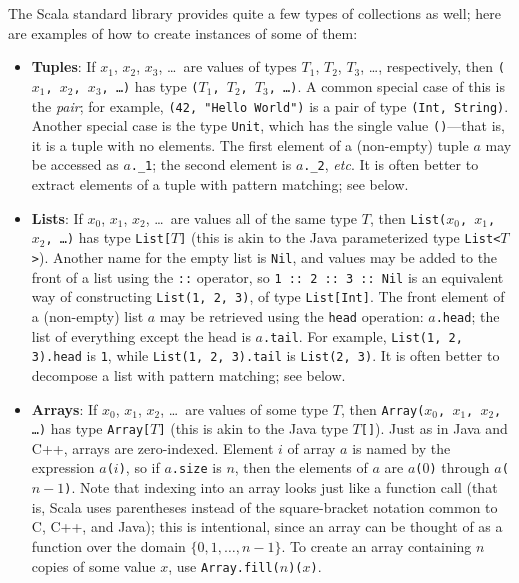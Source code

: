The Scala standard library provides quite a few types of collections as well; here are examples of how to create instances of some of them:
\begin{itemize}
\item \textbf{Tuples}: If $x_1$, $x_2$, $x_3$, \ldots\ are values of types $T_1$, $T_2$, $T_3$, \ldots, respectively, then \texttt{($x_1$, $x_2$, $x_3$, \ldots)} has type \texttt{($T_1$, $T_2$, $T_3$, \ldots)}. A common special case of this is the \emph{pair}; for example, \texttt{(42, "Hello World")} is a pair of type \texttt{(Int, String)}. Another special case is the type \texttt{Unit}, which has the single value \texttt{()}---that is, it is a tuple with no elements. The first element of a (non-empty) tuple $a$ may be accessed as $a$\verb|._1|; the second element is $a$\verb|._2|, \textit{etc}. It is often better to extract elements of a tuple with pattern matching; see below.

\item \textbf{Lists}: If $x_0$, $x_1$, $x_2$, \ldots\ are values all of the same type $T$, then \texttt{List($x_0$, $x_1$, $x_2$, \ldots)} has type \texttt{List[$T$]} (this is akin to the Java parameterized type \texttt{List<$T$>}). Another name for the empty list is \texttt{Nil}, and values may be added to the front of a list using the \texttt{::} operator, so \verb|1 :: 2 :: 3 :: Nil| is an equivalent way of constructing \texttt{List(1, 2, 3)}, of type \texttt{List[Int]}. The front element of a (non-empty) list $a$ may be retrieved using the \texttt{head} operation: \texttt{$a$.head}; the list of everything except the head is \texttt{$a$.tail}. For example, \texttt{List(1, 2, 3).head} is \texttt{1}, while \texttt{List(1, 2, 3).tail} is \texttt{List(2, 3)}. It is often better to decompose a list with pattern matching; see below.

\item \textbf{Arrays}:  If $x_0$, $x_1$, $x_2$, \ldots\ are values of some type $T$, then \texttt{Array($x_0$, $x_1$, $x_2$, \ldots)} has type \texttt{Array[$T$]} (this is akin to the Java type \texttt{$T$[]}). Just as in Java and C++, arrays are zero-indexed. Element $i$ of array $a$ is named by the expression \texttt{$a$($i$)}, so if \texttt{$a$.size} is $n$, then the elements of $a$ are \texttt{$a$($0$)} through \texttt{$a$($n-1$)}. Note that indexing into an array looks just like a function call (that is, Scala uses parentheses instead of the  square-bracket notation common to C, C++, and Java); this is intentional, since an array can be thought of as a function over the domain $\{0, 1, \ldots, n-1\}$. To create an array containing $n$ copies of some value $x$, use \texttt{Array.fill($n$)($x$)}.


\end{itemize}
